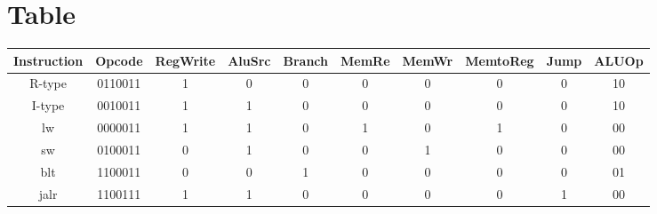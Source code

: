 \documentclass{report}
\begin{document}
\section*{Table}
\begin{table}[ht]
\centering
\begin{tabular}{|c|c|c|c|c|c|c|c|c|c|}
    \hline
    Instruction & Opcode & RegWrite & AluSrc & Branch & MemRe & MemWr & MemtoReg & Jump & ALUOp \\
    \hline
    R-type & 0110011 & 1 & 0 & 0 & 0 & 0 & 0 & 0 & 10 \\
    \hline
    I-type & 0010011 & 1 & 1 & 0 & 0 & 0 & 0 & 0 & 10 \\
    \hline
    lw & 0000011 & 1 & 1 & 0 & 1 & 0 & 1 & 0 & 00 \\
    \hline
    sw & 0100011 & 0 & 1 & 0 & 0 & 1 & 0 & 0 & 00 \\
    \hline
    blt & 1100011 & 0 & 0 & 1 & 0 & 0 & 0 & 0 & 01 \\
    \hline
    jalr & 1100111 & 1 & 1 & 0 & 0 & 0 & 0 & 1 & 00 \\
    \hline
\end{tabular}
\end{table}
\end{document}
